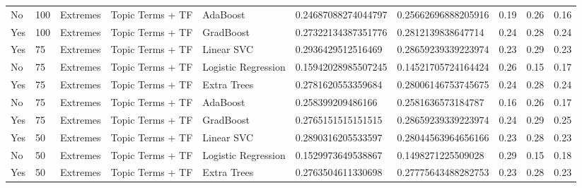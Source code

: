 \begin{table}[]
\begin{tabular}{@{}llllllllll@{}}
    No                  & 100             & Extremes              & Topic Terms + TF      & AdaBoost            & 0.24687088274044797     & 0.25662696888205916    & 0.19               & 0.26            & 0.16              \\
    Yes                 & 100             & Extremes              & Topic Terms + TF      & GradBoost           & 0.27322134387351776     & 0.2812139838647714     & 0.24               & 0.28            & 0.24              \\
    Yes                 & 75              & Extremes              & Topic Terms + TF      & Linear SVC          & 0.2936429512516469      & 0.28659239339223974    & 0.23               & 0.29            & 0.23              \\
    No                  & 75              & Extremes              & Topic Terms + TF      & Logistic Regression & 0.15942028985507245     & 0.14521705724164424    & 0.26               & 0.15            & 0.17              \\
    Yes                 & 75              & Extremes              & Topic Terms + TF      & Extra Trees         & 0.2781620553359684      & 0.28006146753745675    & 0.24               & 0.28            & 0.24              \\
    No                  & 75              & Extremes              & Topic Terms + TF      & AdaBoost            & 0.258399209486166       & 0.2581636573184787     & 0.16               & 0.26            & 0.17              \\
    Yes                 & 75              & Extremes              & Topic Terms + TF      & GradBoost           & 0.2765151515151515      & 0.28659239339223974    & 0.24               & 0.29            & 0.25              \\
    Yes                 & 50              & Extremes              & Topic Terms + TF      & Linear SVC          & 0.2890316205533597      & 0.28044563964656166    & 0.23               & 0.28            & 0.23              \\
    No                  & 50              & Extremes              & Topic Terms + TF      & Logistic Regression & 0.1529973649538867      & 0.1498271225509028     & 0.29               & 0.15            & 0.18              \\
    Yes                 & 50              & Extremes              & Topic Terms + TF      & Extra Trees         & 0.2763504611330698      & 0.27775643488282753    & 0.23               & 0.28            & 0.23              \\

\end{tabular}
\end{table}
